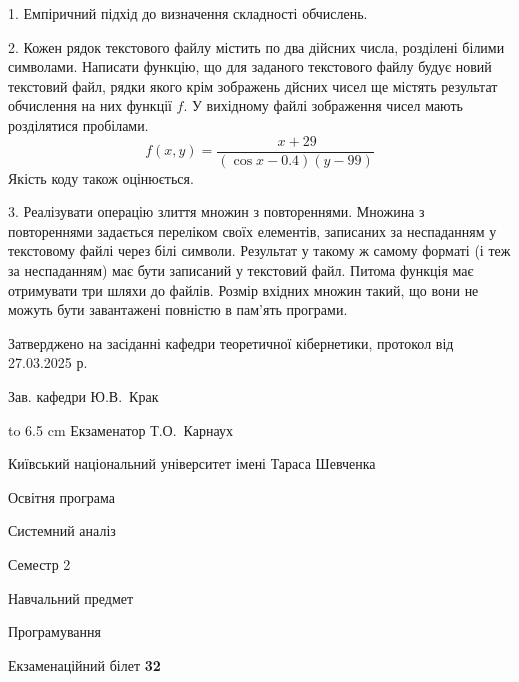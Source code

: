 \documentclass[12pt, ukrainian]{article}
\begin{document}
{%
1. Емпіричний підхід до визначення складності обчислень.%
\par
\vspace{2mm}

2. Кожен рядок текстового файлу містить по два дійсних числа, розділені білими символами.
Написати функцію, що для заданого текстового файлу будує новий текстовий файл, рядки якого крім зображень дйсних чисел ще містять результат обчислення на них функції $f$. У вихідному файлі зображення чисел мають розділятися пробілами. 
$$f(x, y) =\frac{\ x + 29}{(\cos x - 0.4) (y - 99)}$$ 
Якість коду також оцінюється.

\par
\vspace{2mm}

3. Реалізувати операцію злиття множин з повтореннями. Множина з повтореннями задається переліком своїх елементів, записаних за неспаданням у текстовому файлі через білі символи. Результат у такому ж самому форматі (і теж за неспаданням) має бути записаний у текстовий файл. Питома функція має отримувати три шляхи до файлів. Розмір вхідних множин такий, що вони не можуть бути завантажені повністю в пам’ять програми.

}
{\smallskip\smallskip \begin {scriptsize} Затверджено на засіданні кафедри теоретичної кібернетики, протокол   від   27.03.2025 р.\par\smallskip\smallskip\smallskip\smallskip
{\parbox {6.5 cm} {Зав. кафедри \dotfill Ю.В.~Крак}}\hspace {0.7cm} {\hbox to 6.5 cm { Екзаменатор \dotfill Т.О.~Карнаух}} \end{scriptsize}}
\vspace{2.9cm}
{{\begin {scriptsize}\par
{ \center  Київський національний університет імені Тараса Шевченка \par}
{\parbox {5 cm}{Освітня програма \hfill}{\parbox {7 cm}{Системний аналіз\hfill}}\parbox {6 cm}{\hfill Семестр 2}}\par
{\parbox {5 cm} {Навчальний предмет \hfill}\parbox {7 cm}{Програмування \hfill}\parbox {6cm}{\hfill}\par}\vspace{-15pt} \end{scriptsize}}{\center Екзаменаційний білет \No \textbf { 32 }\par}}
\end{document}
